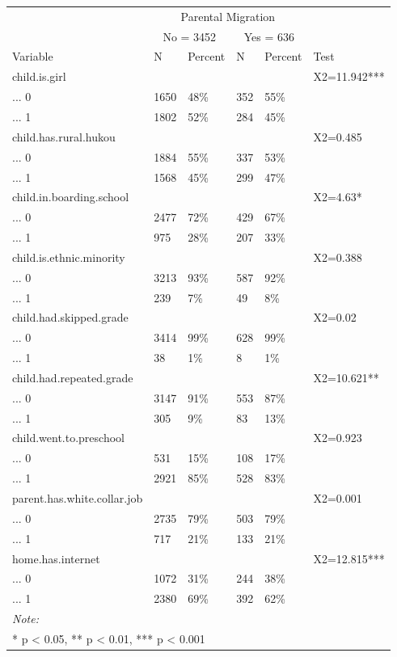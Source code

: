 \documentclass[
  man,floatsintext]{apa7}
\begin{document}
\begin{tabular}{llllll}
\toprule
\multicolumn{1}{c}{ } & \multicolumn{4}{c}{Parental Migration} \\
\cmidrule(l{3pt}r{3pt}){2-5}
\multicolumn{1}{c}{ } & \multicolumn{2}{c}{No = 3452} & \multicolumn{2}{c}{Yes = 636} \\
\cmidrule(l{3pt}r{3pt}){2-3} \cmidrule(l{3pt}r{3pt}){4-5}
Variable & N & Percent & N & Percent & Test\\
\midrule
child.is.girl &  &  &  &  & X2=11.942***\\
... 0 & 1650 & 48\% & 352 & 55\% & \\
... 1 & 1802 & 52\% & 284 & 45\% & \\
child.has.rural.hukou &  &  &  &  & X2=0.485\\
... 0 & 1884 & 55\% & 337 & 53\% & \\
\addlinespace
... 1 & 1568 & 45\% & 299 & 47\% & \\
child.in.boarding.school &  &  &  &  & X2=4.63*\\
... 0 & 2477 & 72\% & 429 & 67\% & \\
... 1 & 975 & 28\% & 207 & 33\% & \\
child.is.ethnic.minority &  &  &  &  & X2=0.388\\
\addlinespace
... 0 & 3213 & 93\% & 587 & 92\% & \\
... 1 & 239 & 7\% & 49 & 8\% & \\
child.had.skipped.grade &  &  &  &  & X2=0.02\\
... 0 & 3414 & 99\% & 628 & 99\% & \\
... 1 & 38 & 1\% & 8 & 1\% & \\
\addlinespace
child.had.repeated.grade &  &  &  &  & X2=10.621**\\
... 0 & 3147 & 91\% & 553 & 87\% & \\
... 1 & 305 & 9\% & 83 & 13\% & \\
child.went.to.preschool &  &  &  &  & X2=0.923\\
... 0 & 531 & 15\% & 108 & 17\% & \\
\addlinespace
... 1 & 2921 & 85\% & 528 & 83\% & \\
parent.has.white.collar.job &  &  &  &  & X2=0.001\\
... 0 & 2735 & 79\% & 503 & 79\% & \\
... 1 & 717 & 21\% & 133 & 21\% & \\
home.has.internet &  &  &  &  & X2=12.815***\\
\addlinespace
... 0 & 1072 & 31\% & 244 & 38\% & \\
... 1 & 2380 & 69\% & 392 & 62\% & \\
\bottomrule
\multicolumn{6}{l}{\rule{0pt}{1em}\textit{Note: }}\\
\multicolumn{6}{l}{\rule{0pt}{1em}* p < 0.05, ** p < 0.01, *** p < 0.001}\\
\end{tabular}
\end{document}
